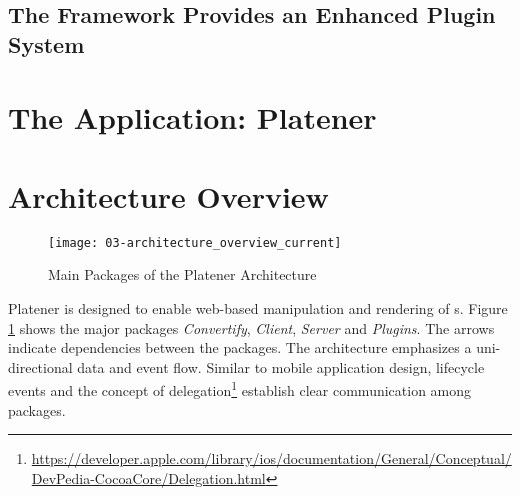 \documentclass[../ClassicThesis.tex]{subfiles}
\begin{document}
\subsection{The Framework Provides an Enhanced Plugin System}
\label{sec:plugin-system}



\section{The Application: Platener}
\label{sec:application-platener}



















\section{Architecture Overview}

\begin{figure}
  \texttt{[image: 03-architecture\_overview\_current]}
  \caption{Main Packages of the Platener Architecture}
  \label{fig:architectureOverviewCurrent}
\end{figure}

Platener is designed to enable web-based manipulation and rendering of
{\threedmodel}s. Figure \ref{fig:architectureOverviewCurrent} shows the major
packages \emph{Convertify}, \emph{Client}, \emph{Server} and \emph{Plugins}. The
arrows indicate dependencies between the packages. The architecture emphasizes a
uni-directional data and event flow. Similar to mobile application design,
lifecycle events and the concept of
delegation\footnote{\url{https://developer.apple.com/library/ios/documentation/General/Conceptual/DevPedia-CocoaCore/Delegation.html}}
establish clear communication among packages.

\end{document}
